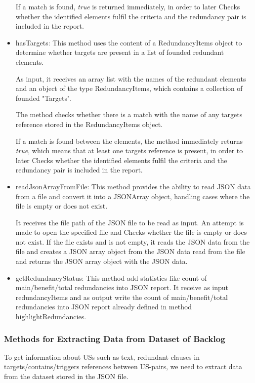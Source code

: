 \begin{itemize}
	If a match is found, \textit{true} is returned immediately, in order to later Checks whether the identified elements fulfil the criteria and the redundancy pair is included in the report.
	
	\item hasTargets: This method uses the content of a RedundancyItems object to determine whether targets are present in a list of founded redundant elements.
	
	As input, it receives an array list with the names of the redundant elements and an object of the type RedundancyItems, which contains a collection of founded "Targets".
	
	The method checks whether there is a match with the name of any targets reference stored in the RedundancyItems object. 
	
	If a match is found between the elements, the method immediately returns \textit{true}, which means that at least one targets reference is present, in order to later Checks whether the identified elements fulfil the criteria and the redundancy pair is included in the report.
	
	\item readJsonArrayFromFile: This method provides the ability to read JSON data from a file and convert it into a JSONArray object, handling cases where the file is empty or does not exist.
	
	It receives the file path of the JSON file to be read as input. An attempt is made to open the specified file and Checks whether the file is empty or does not exist. If the file exists and is not empty, it reads the JSON data from the file and creates a JSON array object from the JSON data read from the file and returns the JSON array object with the JSON data.
	
	
	\item getRedundancyStatus: This method add statistics like count of main/benefit/total redundancies into JSON report. It receive as input redundancyItems and as output write the count of main/benefit/total redundancies into JSON report already defined in method highlightRedundancies.
\end{itemize}
\subsubsection*{Methods for Extracting Data from Dataset of Backlog}
To get information about USs such as text, redundant clauses in targets/contains/triggers references between US-pairs, we need to extract data from the dataset stored in the JSON file.

